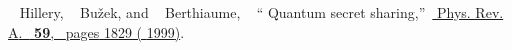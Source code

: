 \documentclass[aps,pra,twocolumn,groupedaddress,showpacs,showkeys]{revtex4-1}
\begin{document}
\begin{thebibliography}{27}
   \BibitemOpen
   { {~\bibnamefont
  {Hillery}, ~\bibnamefont
  {Bu\v{z}ek}, and ~\bibnamefont
  {Berthiaume},} \ }  {\enquote { {Quantum secret sharing},}\ }\href {\doibase 10.1103/PhysRevA.59.1829} { { {Phys. Rev. A}.\ } \textbf { {59}},\ \bibinfo
  {pages} {1829} ( {1999})}.%

\end{thebibliography}
\end{document}
